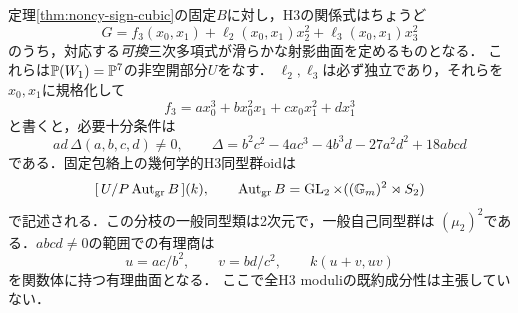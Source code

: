 \begin{theorem}
\label{thm:fixed-sign-classification}
定理\ref{thm:noncy-sign-cubic}の固定$B$に対し，H3の関係式はちょうど
\[
 G=f_3(x_0,x_1)+\ell_2(x_0,x_1)x_2^2+\ell_3(x_0,x_1)x_3^2
\]
のうち，対応する\emph{可換}三次多項式が滑らかな射影曲面を定めるものとなる．
これらは$\mathbb P(W_1)=\mathbb P^7$の非空開部分$U$をなす．
$\ell_2,\ell_3$は必ず独立であり，それらを$x_0,x_1$に規格化して
\[
 f_3=ax_0^3+bx_0^2x_1+cx_0x_1^2+dx_1^3
\]
と書くと，必要十分条件は
\[
 ad\,\Delta(a,b,c,d)\ne0,\qquad
 \Delta=b^2c^2-4ac^3-4b^3d-27a^2d^2+18abcd
\]
である．固定包絡上の幾何学的H3同型群oidは
\[
 [\,U/P\operatorname{Aut}_{\mathrm{gr}}B\,](k),\qquad
 \operatorname{Aut}_{\mathrm{gr}}B
 =\operatorname{GL}_2\times((\mathbb G_m)^2\rtimes S_2)
\]
で記述される．この分枝の一般同型類は2次元で，一般自己同型群は
$(\mu_2)^2$である．$abcd\ne0$の範囲での有理商は
\[
 u=ac/b^2,\qquad v=bd/c^2,\qquad k(u+v,uv)
\]
を関数体に持つ有理曲面となる．
ここで全H3 moduliの既約成分性は主張していない．
\end{theorem}
